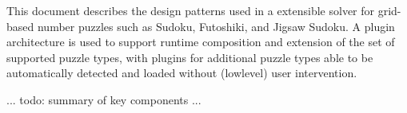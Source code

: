 This document describes the design patterns used in a extensible solver for grid-based number puzzles such as Sudoku, Futoshiki, and Jigsaw Sudoku. A plugin architecture is used to support runtime composition and extension of the set of supported puzzle types, with plugins for additional puzzle types able to be automatically detected and loaded without (lowlevel) user intervention.

... todo: summary of key components ...